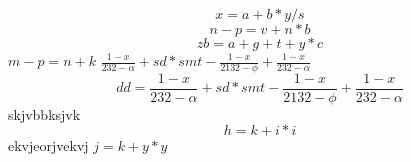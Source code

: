 $$x=a+b*y/s$$
$$n-p=v+n*b$$
\begin{equation}
zb=a+g+t+y*c\end{equation}
\(m-p=n+k\)
$\frac{1 - x}{232 - \alpha} + sd*smt -\frac{1 - x}{2132 - \phi} + \frac{1 - x}{232 - \alpha}$
\begin{equation}
dd = \frac{1 - x}{232 - \alpha} + sd*smt -\frac{1 - x}{2132 - \phi} + \frac{1 - x}{232 - \alpha}
\end{equation}
skjvbbksjvk $$h=k+i*i$$ ekvjeorjvekvj
$j=k+y*y$